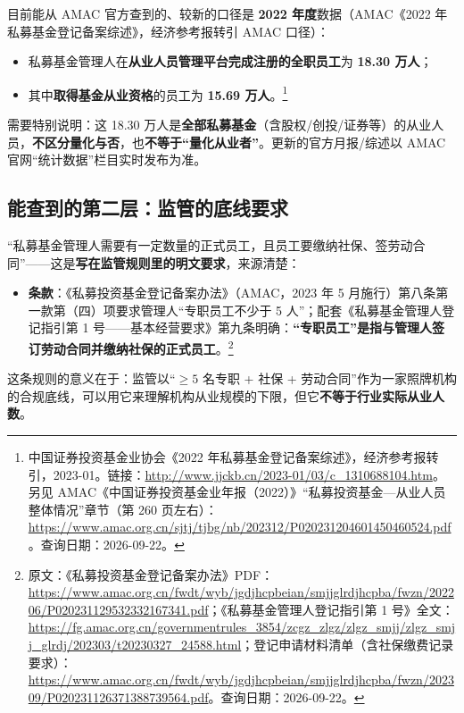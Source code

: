 \documentclass[UTF8,11pt]{ctexart}
\begin{document}
目前能从 AMAC 官方查到的、较新的口径是 \textbf{2022 年度}数据（AMAC《2022 年私募基金登记备案综述》，经济参考报转引 AMAC 口径）：
\begin{itemize}[itemsep=2pt]
\item 私募基金管理人在\textbf{从业人员管理平台完成注册的全职员工}为 \textbf{18.30 万人}；
\item 其中\textbf{取得基金从业资格}的员工为 \textbf{15.69 万人}。\footnote{中国证券投资基金业协会《2022 年私募基金登记备案综述》，经济参考报转引，2023-01。链接：\url{http://www.jjckb.cn/2023-01/03/c_1310688104.htm}。另见 AMAC《中国证券投资基金业年报（2022）》“私募投资基金—从业人员整体情况”章节（第 260 页左右）：\url{https://www.amac.org.cn/sjtj/tjbg/nb/202312/P020231204601450460524.pdf}。查询日期：2026-09-22。}
\end{itemize}

需要特别说明：这 18.30 万人是\textbf{全部私募基金}（含股权/创投/证券等）的从业人员，\textbf{不区分量化与否}，也\textbf{不等于“量化从业者”}。更新的官方月报/综述以 AMAC 官网“统计数据”栏目实时发布为准。

\subsection{能查到的第二层：监管的底线要求}

“私募基金管理人需要有一定数量的正式员工，且员工要缴纳社保、签劳动合同”——这是\textbf{写在监管规则里的明文要求}，来源清楚：
\begin{itemize}[itemsep=2pt]
\item \textbf{条款}：《私募投资基金登记备案办法》（AMAC，2023 年 5 月施行）第八条第一款第（四）项要求管理人“专职员工不少于 5 人”；配套《私募基金管理人登记指引第 1 号——基本经营要求》第九条明确：\textbf{“专职员工”是指与管理人签订劳动合同并缴纳社保的正式员工}。\footnote{原文：《私募投资基金登记备案办法》PDF：\url{https://www.amac.org.cn/fwdt/wyb/jgdjhcpbeian/smjjglrdjhcpba/fwzn/202206/P020231129532332167341.pdf}；《私募基金管理人登记指引第 1 号》全文：\url{https://fg.amac.org.cn/governmentrules_3854/zcgz_zlgz/zlgz_smjj/zlgz_smjj_glrdj/202303/t20230327_24588.html}；登记申请材料清单（含社保缴费记录要求）：\url{https://www.amac.org.cn/fwdt/wyb/jgdjhcpbeian/smjjglrdjhcpba/fwzn/202309/P020231126371388739564.pdf}。查询日期：2026-09-22。}
\end{itemize}

这条规则的意义在于：监管以“${}\ge 5$ 名专职 + 社保 + 劳动合同”作为一家照牌机构的合规底线，可以用它来理解机构从业规模的下限，但它\textbf{不等于行业实际从业人数}。
\end{document}
